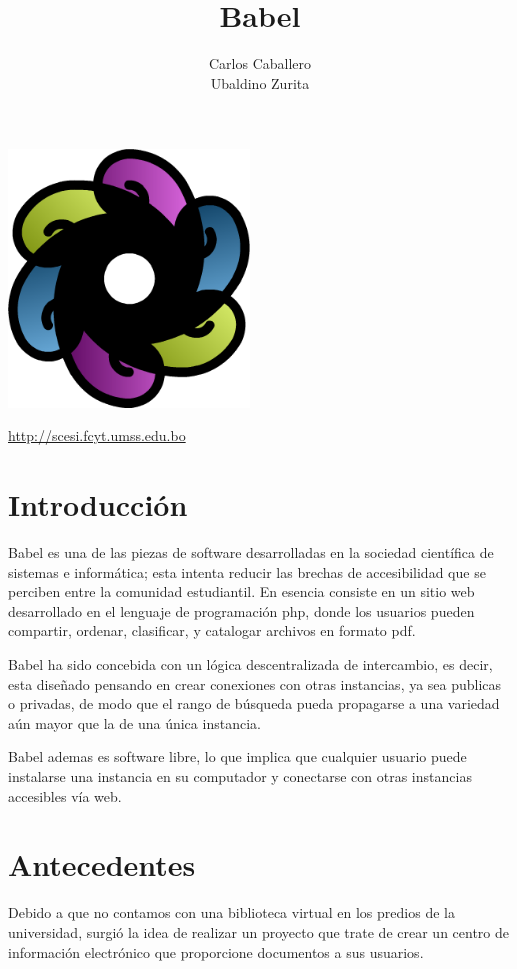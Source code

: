 \documentclass[letter,12pt]{article}
\title{\bf Babel}
\author{Carlos Caballero\\Ubaldino Zurita}
\begin{document}
\maketitle
\begin{center}\includegraphics[width=0.48\textwidth]{../img/babel.png}\end{center}
\begin{center}\url {http://scesi.fcyt.umss.edu.bo}\end{center}
\pagebreak

\tableofcontents
\pagebreak

\section{Introducción}
Babel es una de las piezas de software desarrolladas en la sociedad científica de sistemas e
informática; esta intenta reducir las brechas de accesibilidad que se perciben entre la comunidad
estudiantil. En esencia consiste en un sitio web desarrollado en el lenguaje de programación php,
donde los usuarios pueden compartir, ordenar, clasificar, y catalogar archivos en formato pdf.

Babel ha sido concebida con un lógica descentralizada de intercambio, es decir, esta diseñado
pensando en crear conexiones con otras instancias, ya sea publicas o privadas, de modo que el rango
de búsqueda pueda propagarse a una variedad aún mayor que la de una única instancia.

Babel ademas es software libre, lo que implica que cualquier usuario puede instalarse una instancia
en su computador y conectarse con otras instancias accesibles vía web.

\section{Antecedentes}
Debido a que no contamos con una biblioteca virtual en los predios de la universidad, surgió la
idea de realizar un proyecto que trate de crear un centro de información electrónico que 
proporcione documentos a sus usuarios.
\end{document}
